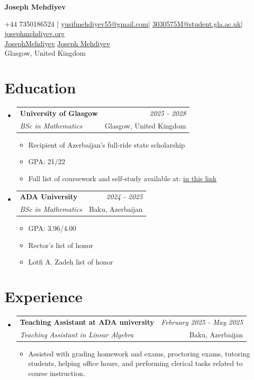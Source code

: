 \documentclass[a4paper,11pt]{article}
\makeatletter
\newcommand{\resumeSubheading}[4]{
    \vspace{-0.5mm}
\item
    \begin{tabular*}{0.98\textwidth}[t]{l@{\extracolsep{\fill}}r}
        \textbf{#1} & \textit{\footnotesize{#4}} \\
        \textit{\footnotesize{#3}} &  \footnotesize{#2}\\
    \end{tabular*}
    \vspace{-3mm}
}
\newcommand{\resumeSubHeadingListStart}{
\begin{itemize}[leftmargin=*,labelsep=1mm]}
\newcommand{\resumeItemListStart}{
                \begin{itemize}[leftmargin=*,labelsep=1mm,itemsep=0.5mm]}
\newcommand{\resumeSubHeadingListEnd}{
                    \end{itemize}\vspace{-2mm}}
\newcommand{\resumeItemListEnd}{
    \end{itemize}\vspace{-2mm}}
\newcommand{\socialicon}[1]{\raisebox{-0.05em}{\resizebox{!}{1em}{#1}}}
\newcommand{\headerfontiii}{\fontfamily{ppl}\selectfont} %
\makeatother
\begin{document}
\headerfontiii

\begin{center}
    {\Huge\textbf{Joseph Mehdiyev}}
\end{center}

\begin{center}
    \small{
        +44 7350186524 | \href{mailto:yusifmehdiyev55@gmail.com}{yusifmehdiyev55@gmail.com}|
        \href{mailto:3030575M@student.gla.ac.uk}{3030575M@student.gla.ac.uk}|
        \href{https://josephmehdiyev.org/}{josephmehdiyev.org}
    } \\
    \small{
        \socialicon{\faGithub} \href{https://github.com/JosephMehdiyev}{JosephMehdiyev}
        \socialicon{\faLinkedin} \href{https://www.linkedin.com/in/joseph-mehdiyev-6155982ab/} {Joseph Mehdiyev}
    }
    \\
    \small{Glasgow, United Kingdom} 
\end{center}


\section{\textbf{Education}}
\resumeSubHeadingListStart
\resumeSubheading
{University of Glasgow}{Glasgow, United Kingdom}
{BSc in Mathematics}{2025 - 2028}
\resumeItemListStart
\item Recipient of Azerbaijan’s full-ride state scholarship
\item GPA: 21/22
\item Full list of coursework and self-study available at: \href{https://josephmehdiyev.org/about/coursework.pdf}{in this link}

\resumeItemListEnd
\resumeSubheading
{ADA University}{Baku, Azerbaijan}
{BSc in Mathematics}{2024 - 2025}
\resumeItemListStart
\item GPA: 3.96/4.00
\item Rector’s list of honor
\item Lotfi A. Zadeh list of honor

\resumeItemListEnd
\resumeSubHeadingListEnd
\vspace{-3mm}
\section{\textbf{Experience}}
\resumeSubHeadingListStart
\resumeSubheading
{{Teaching Assistant at ADA university }}{Baku, Azerbaijan}
{Teaching Assistant in Linear Algebra}{February 2025 - May 2025}
\resumeItemListStart
\item Assisted with grading homework and exams, proctoring exams, tutoring students, helping office hours, and performing clerical tasks related to course instruction.
\resumeItemListEnd
\resumeSubHeadingListEnd
\vspace{-3mm}
\end{document}
